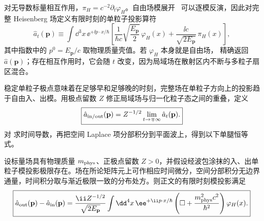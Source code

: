 对无导数标量相互作用，$\pi_H=c^{-2}\partial_t\varphi_H$。自由场模展开~ 可以逐模反演，因此对完整 Heisenberg 场定义有限时刻的单粒子投影算符
\begin{equation}
 \hat a_t(\mathbf p)
 \equiv\int\dd^3 x\,\ee^{+\ii p\cdot x/\hbar}
 \left[
 \frac{1}{\hbar c}\sqrt{\frac{E_{\mathbf p}}{2}}\,\varphi_H(x)
 +\frac{\ii c}{\sqrt{2E_{\mathbf p}}}\,\pi_H(x)
 \right],
 \label{eq:lsz-finite-time-mode-projection-dp52}
\end{equation}
其中指数中的 $p^0=E_{\mathbf p}/c$ 取物理质量壳值。若 $\varphi_H$ 本身就是自由场， 精确返回 $\hat a(\mathbf p)$；存在相互作用时，它会随 $t$ 改变，因为局域场在散射区内不断与多粒子扇区混合。

稳定单粒子极点意味着在足够早和足够晚的时刻，完整场在单粒子方向上的投影趋于自由入、出模。用极点留数 $Z$ 修正局域场与归一化粒子态之间的重叠，定义
\begin{equation}
 \boxed{
 \hat a_{\rm in/out}(\mathbf p)
 =Z^{-1/2}\lim_{t\to\mp\infty}\hat a_t(\mathbf p).}
 \label{eq:asymptotic-annihilator-projection-dp52}
\end{equation}
对 求时间导数，再把空间 Laplace 项分部积分到平面波上，得到以下单腿恒等式。
\begin{proposition}[稳定标量单腿的约化恒等式]
设标量场具有物理质量 $m_{\rm phys}$、正极点留数 $Z>0$，并假设经波包涂抹的入、出单粒子模投影极限存在。场在所论矩阵元上可作相应时间微分，空间分部积分无边界通量，时间积分取与渐近极限一致的分布处方。则正文的有限时刻模投影满足
\begin{equation}
 \boxed{
 \hat a_{\rm out}(\mathbf p)-\hat a_{\rm in}(\mathbf p)
 =\frac{\ii Z^{-1/2}}{\sqrt{2E_{\mathbf p}}}
 \int\dd^4 x\,
 \ee^{+\ii p\cdot x/\hbar}
 \left(\Box+\frac{m_{\rm phys}^2c^2}{\hbar^2}\right)
 \varphi_H(x).}
 \label{eq:lsz-one-leg-position-dp52}
\end{equation}
\end{proposition}
